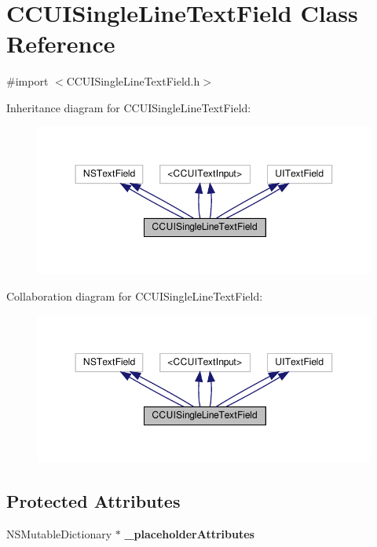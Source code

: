 \hypertarget{interfaceCCUISingleLineTextField}{}\section{C\+C\+U\+I\+Single\+Line\+Text\+Field Class Reference}
\label{interfaceCCUISingleLineTextField}


{\ttfamily \#import $<$C\+C\+U\+I\+Single\+Line\+Text\+Field.\+h$>$}



Inheritance diagram for C\+C\+U\+I\+Single\+Line\+Text\+Field\+:
\nopagebreak
\begin{figure}[H]
\begin{center}
\leavevmode
\includegraphics[width=350pt]{interfaceCCUISingleLineTextField__inherit__graph}
\end{center}
\end{figure}


Collaboration diagram for C\+C\+U\+I\+Single\+Line\+Text\+Field\+:
\nopagebreak
\begin{figure}[H]
\begin{center}
\leavevmode
\includegraphics[width=350pt]{interfaceCCUISingleLineTextField__coll__graph}
\end{center}
\end{figure}
\subsection*{Protected Attributes}
\begin{DoxyCompactItemize}
\item 
\mbox{\label{interfaceCCUISingleLineTextField_a4d28a112f0d781b8a424f24ac9bb56cb}} 
N\+S\+Mutable\+Dictionary $\ast$ {\bfseries \+\_\+placeholder\+Attributes}
\end{DoxyCompactItemize}
